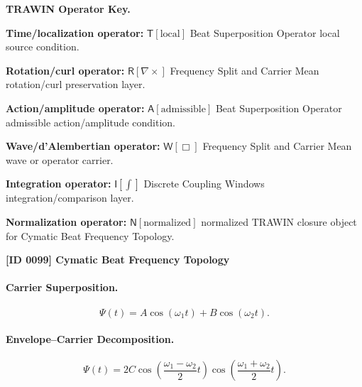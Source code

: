 \par\vspace{0.45\baselineskip}
\noindent\begin{minipage}[t]{\linewidth}
\begingroup
\small
\raggedright
\textbf{TRAWIN Operator Key.}\par
\noindent\textbf{Time/localization operator:} $\mathsf{T}\!\left[\mathrm{local}\right]$ Beat Superposition Operator local source condition.\par
\noindent\textbf{Rotation/curl operator:} $\mathsf{R}\!\left[\nabla\times\right]$ Frequency Split and Carrier Mean rotation/curl preservation layer.\par
\noindent\textbf{Action/amplitude operator:} $\mathsf{A}\!\left[\mathrm{admissible}\right]$ Beat Superposition Operator admissible action/amplitude condition.\par
\noindent\textbf{Wave/d'Alembertian operator:} $\mathsf{W}\!\left[\Box\right]$ Frequency Split and Carrier Mean wave or operator carrier.\par
\noindent\textbf{Integration operator:} $\mathsf{I}\!\left[\int\right]$ Discrete Coupling Windows integration/comparison layer.\par
\noindent\textbf{Normalization operator:} $\mathsf{N}\!\left[\mathrm{normalized}\right]$ normalized TRAWIN closure object for Cymatic Beat Frequency Topology.\par
\endgroup
\end{minipage}

\clearpage
\noindent\textbf{[ID 0099] Cymatic Beat Frequency Topology}\par
\vspace{0.35em}
\paragraph{Carrier Superposition.}
\begin{equation}
\Psi(t)=A\cos(\omega_1t)+B\cos(\omega_2t).
\end{equation}

\paragraph{Envelope--Carrier Decomposition.}
\begin{equation}
\Psi(t)
=
2C
\cos\left(
\frac{\omega_1-\omega_2}{2}t
\right)
\cos\left(
\frac{\omega_1+\omega_2}{2}t
\right).
\end{equation}

